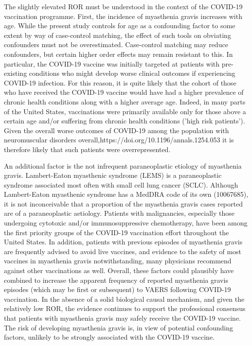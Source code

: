 \documentclass{article}
\begin{document}
The slightly elevated ROR must be understood in the context of the COVID-19 vaccination programme.
First, the incidence of myasthenia gravis increases with age.\cite{https://doi.org/10.1196/annals.1254.053,phillips1992epidemiology}
While the present study controls for age as a confounding factor to some extent by way of case-control matching, the effect of such tools on obviating confounders must not be overestimated.\cite{mansournia2018case}
Case-control matching may reduce confounders, but certain higher order effects may remain resistant to this.
In particular, the COVID-19 vaccine was initially targeted at patients with pre-existing conditions who might develop worse clinical outcomes if experiencing COVID-19 infection.
For this reason, it is quite likely that the cohort of those who have received the COVID-19 vaccine would have had a higher prevalence of chronic health conditions along with a higher average age.
Indeed, in many parts of the United States, vaccinations were primarily available only for those above a certain age and/or suffering from chronic health conditions ('high risk patients').
Given the overall worse outcomes of COVID-19 among the population with neuromuscular disorders overall,{https://doi.org/10.1196/annals.1254.053} it is therefore likely that such patients were overrepresented.

An additional factor is the not infrequent paraneoplastic etiology of myasthenia gravis.
Lambert-Eaton myasthenic syndrome (LEMS) is a paraneoplastic syndrome associated most often with small cell lung cancer (SCLC).\cite{o1988lambert}
Although Lambert-Eaton myasthenic syndrome has a MedDRA code of its own (10067685), it is not inconceivable that a proportion of the myasthenia gravis cases reported are of a paraneoplastic aetiology.
Patients with malignancies, especially those undergoing cytotoxic and/or immunosuppressive chemotherapy, have been among the first priority groups of the COVID-19 vaccination effort throughout the United States.
In addition, patients with previous episodes of myasthenia gravis are frequently advised to avoid live vaccines,\cite{gilhus2018myasthenia} and evidence to the safety of most vaccines in myasthenia gravis notwithstanding, many physicians recommend against other vaccinations as well.\cite{zinman2009safety}
Overall, these factors could plausibly have combined to increase the apparent frequency of reported myasthenia gravis episodes (which may be first or subsequent) to VAERS following COVID-19 vaccination.
In the absence of a solid biological causal mechanism, and given the relatively low ROR, the evidence continues to support the professional consensus that patients with myasthenia gravis may safely receive the COVID-19 vaccine.\cite{vzivkovic2021doctor}
The risk of developing myasthenia gravis is, in view of potential confounding factors, unlikely to be strongly associated with the COVID-19 vaccine.
\end{document}
